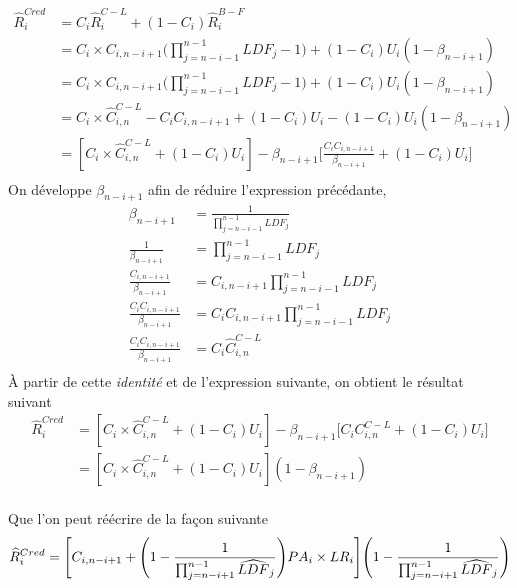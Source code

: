 \documentclass[11pt,french]{report}
\begin{document}
\begin{align*}
\widehat{R}_i^{Cred} &= C_i \widehat{R}_i^{C-L} + (1 - C_i) \widehat{R}_i^{B-F} \\
&= C_i \times C_{i, n-i+1} \Bigg( \prod_{j=n-i-1}^{n-1} LDF_j - 1 \Bigg) + (1 - C_i) U_i (1 - \beta_{n-i+1}) \\
&= C_i \times C_{i, n-i+1} \Bigg( \prod_{j=n-i-1}^{n-1} LDF_j - 1 \Bigg) + (1 - C_i) U_i (1 - \beta_{n-i+1}) \\
&=C_i \times \widehat{C}_{i, n}^{C-L} - C_i C_{i, n-i+1}  + (1 - C_i) U_i - (1 - C_i)U_i (1 - \beta_{n-i+1}) \\
&= [C_i \times \widehat{C}_{i, n}^{C-L} + (1 - C_i) U_i] - \beta_{n-i+1}\Bigg[ \frac{C_i C_{i, n-i+1}}{\beta_{n-i+1} } + (1 - C_i)U_i\Bigg] \\
\end{align*}
On développe $\beta_{n-i+1}$ afin de réduire l'expression précédante,
\begin{align*}
\beta_{n-i+1} &= \frac{1}{\prod_{j=n-i-1}^{n-1} LDF_j} \\
\frac{1}{\beta_{n-i+1}} &= \prod_{j=n-i-1}^{n-1} LDF_j \\
\frac{C_{i, n-i+1}}{\beta_{n-i+1}} &= C_{i, n-i+1} \prod_{j=n-i-1}^{n-1} LDF_j \\
\frac{C_i C_{i, n-i+1}}{\beta_{n-i+1}} &= C_i C_{i, n-i+1} \prod_{j=n-i-1}^{n-1} LDF_j \\
\frac{C_i C_{i, n-i+1}}{\beta_{n-i+1}} &= C_i \widehat{C}_{i, n}^{C-L} \\
\end{align*}
À partir de cette \textit{identité} et de l'expression suivante, on obtient le résultat suivant
\begin{align*}
\widehat{R}_i^{Cred} &= [C_i \times \widehat{C}_{i, n}^{C-L} + (1 - C_i) U_i] - \beta_{n-i+1} \Bigg[ C_i C_{i, n}^{C-L}  + (1 - C_i)U_i \Bigg] \\
&= [C_i \times \widehat{C}_{i, n}^{C-L} + (1 - C_i) U_i] ( 1 - \beta_{n-i+1}) \\
\end{align*}

Que l'on peut réécrire de la façon suivante
\begin{equation}
\widehat{R}_i^{Cred} = \Bigg[C_{i, n - i + 1} + \Bigg(1 - \frac{1}{\prod_{j = n - i + 1}^{n- 1} \widehat{LDF}_j} \Bigg) PA_i \times LR_i \Bigg] \Bigg(1 - \frac{1}{\prod_{j = n - i + 1}^{n- 1} \widehat{LDF}_j} \Bigg) \\
\end{equation}
\end{document}
